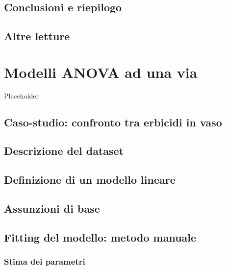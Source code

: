 \documentclass[a4paper,12pt,oneside]{book}
\begin{document}
\hypertarget{conclusioni-e-riepilogo}{%
\section{Conclusioni e riepilogo}\label{conclusioni-e-riepilogo}}

\hypertarget{altre-letture-5}{%
\section{Altre letture}\label{altre-letture-5}}

\hypertarget{modelli-anova-ad-una-via}{%
\chapter{Modelli ANOVA ad una via}\label{modelli-anova-ad-una-via}}

Placeholder

\hypertarget{caso-studio-confronto-tra-erbicidi-in-vaso}{%
\section{Caso-studio: confronto tra erbicidi in vaso}\label{caso-studio-confronto-tra-erbicidi-in-vaso}}

\hypertarget{descrizione-del-dataset}{%
\section{Descrizione del dataset}\label{descrizione-del-dataset}}

\hypertarget{definizione-di-un-modello-lineare}{%
\section{Definizione di un modello lineare}\label{definizione-di-un-modello-lineare}}

\hypertarget{assunzioni-di-base}{%
\section{Assunzioni di base}\label{assunzioni-di-base}}

\hypertarget{fitting-del-modello-metodo-manuale}{%
\section{Fitting del modello: metodo manuale}\label{fitting-del-modello-metodo-manuale}}

\hypertarget{stima-dei-parametri}{%
\subsection{Stima dei parametri}\label{stima-dei-parametri}}
\end{document}
